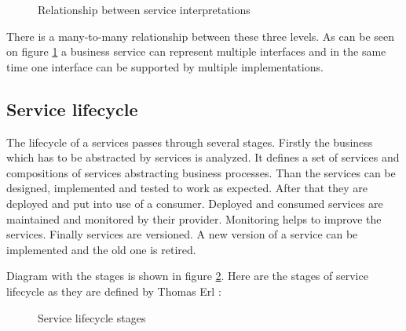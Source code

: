 \begin{figure}[htp] 
\caption{Relationship between service interpretations}
\label{fig:service-levels}
\end{figure}

There is a many-to-many relationship between these three levels. As can be seen on figure \ref{fig:service-levels} a business service can represent multiple interfaces and in the same time one interface can be supported by multiple implementations.

\subsection{Service lifecycle}
\label{subsec:lifecycle}
The lifecycle of a services passes through several stages. Firstly the business which has to be abstracted by services is analyzed. It defines a set of services and compositions of services abstracting business processes. Than the services can be designed, implemented and tested to work as expected. After that they are deployed and put into use of a consumer. Deployed and consumed services are maintained and monitored by their provider. Monitoring helps to improve the services. Finally services are versioned. A new version of a service can be implemented and the old one is retired.

Diagram with the stages is shown in figure \ref{fig:service-lifecycle}. Here are the stages of service lifecycle as they are defined by Thomas Erl \cite{soa-governance}:

\begin{figure}[htp] 
\caption{Service lifecycle stages}
\label{fig:service-lifecycle}
\end{figure}


